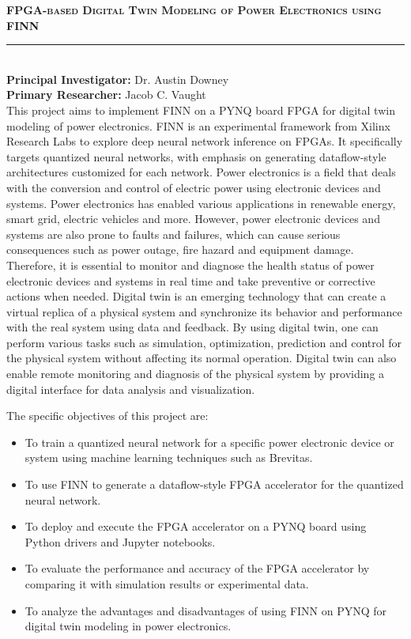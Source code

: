 \documentclass[12pt]{article}
\newcommand{\sect}[1]{\noindent{\color{garnet}\textbf{\textsc{#1}}.}}
\begin{document}
{\color{garnet}\large\textbf{\textsc{FPGA-based Digital Twin Modeling of Power Electronics using FINN}}}\\[-0.8em]
{\color{garnet}\rule{\textwidth}{0.5pt}}\\[0.2em]
\textbf{Principal Investigator:} Dr. Austin Downey\\
\textbf{Primary Researcher:} Jacob C. Vaught\\[0.5em]
\sect{Abstract} This project aims to implement FINN on a PYNQ board FPGA for digital twin modeling of power electronics. FINN is an experimental framework from Xilinx Research Labs to explore deep neural network inference on FPGAs. It specifically targets quantized neural networks, with emphasis on generating dataflow-style architectures customized for each network. Power electronics is a field that deals with the conversion and control of electric power using electronic devices and systems. Power electronics has enabled various applications in renewable energy, smart grid, electric vehicles and more. However, power electronic devices and systems are also prone to faults and failures, which can cause serious consequences such as power outage, fire hazard and equipment damage. Therefore, it is essential to monitor and diagnose the health status of power electronic devices and systems in real time and take preventive or corrective actions when needed. Digital twin is an emerging technology that can create a virtual replica of a physical system and synchronize its behavior and performance with the real system using data and feedback. By using digital twin, one can perform various tasks such as simulation, optimization, prediction and control for the physical system without affecting its normal operation. Digital twin can also enable remote monitoring and diagnosis of the physical system by providing a digital interface for data analysis and visualization.

\sect{Specific Objectives} The specific objectives of this project are:
\begin{itemize}
    \setlength{\itemsep}{0.2em}
    \item To train a quantized neural network for a specific power electronic device or system using machine learning techniques such as Brevitas.
    \item To use FINN to generate a dataflow-style FPGA accelerator for the quantized neural network.
    \item To deploy and execute the FPGA accelerator on a PYNQ board using Python drivers and Jupyter notebooks.
    \item To evaluate the performance and accuracy of the FPGA accelerator by comparing it with simulation results or experimental data.
    \item To analyze the advantages and disadvantages of using FINN on PYNQ for digital twin modeling in power electronics.
\end{itemize}
\end{document}
